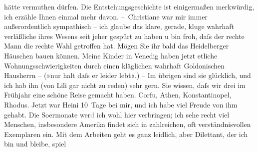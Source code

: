 \begin{ledgroupsized}[t]{13cm}
               hätte vermuthen dürfen. Die Entstehungsgeschichte ist einigermaßen merkwürdig, ich
               erzähle Ihnen einmal mehr davon.\pend
           \pstart
           – Christiane war mir immer außerordentlich
               sympathisch – ich glaube das klare, gerade, kluge wahrhaft verläßliche ihres Wesens
               seit jeher gespürt zu haben u bin froh, daſs der rechte Mann die rechte Wahl getroffen hat. Mögen Sie
               ihr bald das Heidelberger Häuschen bauen können.
               Meine Kinder in Venedig haben jetzt etliche Wohnungsschwierigkeiten
               durch einen kläglichen wahrhaft Goldonischen Hausherrn – (»nur halt daſs er
               leider lebt«.) – Im übrigen sind sie glücklich, und ich hab ihn (von Lili gar nicht zu reden) sehr gern. Sie wissen, daſs wir drei im Frühjahr
               eine schöne Reise gemacht haben. Corfu, Athen, Kon{\pb}stantinopel, Rhodus. Jetzt war Heini 10 Tage bei mir,
               und ich habe viel Freude von ihm gehabt.\pend
           \pstart
           Die So{\geminationm}ermonate wer\textcolor{gray}{d} ich wohl hier
               verbringen; ich sehe recht viel Menschen, insbesondere Amerika findet sich in zahlreichen, oft verständnisvollen Exemplaren ein.
               Mit dem Arbeiten geht es ganz leidlich, aber Dilettant, der ich bin und bleibe, spiel

\end{ledgroupsized}
